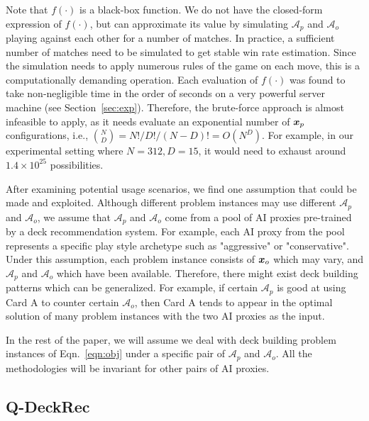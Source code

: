 Note that $f(\cdot)$ is a black-box function. We do not have the closed-form expression of $f(\cdot)$, but can approximate its value by simulating $\mathcal{A}_p$ and $\mathcal{A}_o$ playing against each other for a number of matches. In practice, a sufficient number of matches need to be simulated to get stable win rate estimation. Since the simulation needs to apply numerous rules of the game on each move, this is a computationally demanding operation. Each evaluation of $f(\cdot)$ was found to take non-negligible time in the order of seconds on a very powerful server machine (see Section~\ref{sec:exp}). Therefore, the brute-force approach is almost infeasible to apply, as it needs evaluate an exponential number of $\boldsymbol{x}_p$ configurations, i.e., ${N\choose D}=N!/D!/(N-D)!=O(N^D)$. For example, in our experimental setting where $N=312, D=15$, it would need to exhaust around $1.4 \times 10^{25}$ possibilities. 


After examining potential usage scenarios, we find one assumption that could be made and exploited. Although different problem instances may use different $\mathcal{A}_p$ and $\mathcal{A}_o$, we assume that $\mathcal{A}_p$ and $\mathcal{A}_o$ come from a pool of AI proxies pre-trained by a deck recommendation system. For example, each AI proxy from the pool represents a specific play style archetype such as "aggressive" or "conservative". Under this assumption, each problem instance consists of $\boldsymbol{x}_o$ which may vary, and $\mathcal{A}_p$ and $\mathcal{A}_o$ which have been available. Therefore, there might exist deck building patterns which can be generalized. For example, if certain $\mathcal{A}_p$ is good at using Card A to counter certain $\mathcal{A}_o$, then Card A tends to appear in the optimal solution of many problem instances with the two AI proxies as the input.

In the rest of the paper, we will assume we deal with deck building problem instances of Eqn.~\ref{eqn:obj} under a specific pair of $\mathcal{A}_p$ and $\mathcal{A}_o$. All the methodologies will be invariant for other pairs of AI proxies.





\subsection{Q-DeckRec}

